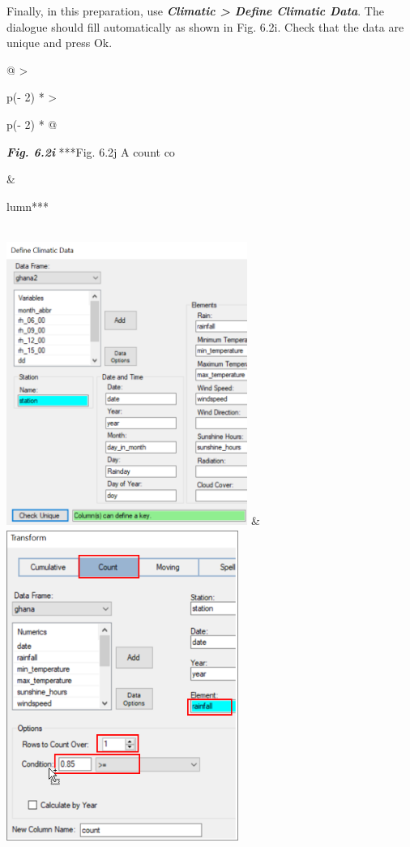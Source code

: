 \documentclass[
  letterpaper,
  DIV=11,
  numbers=noendperiod]{scrreprt}
\begin{document}
Finally, in this preparation, use \textbf{\emph{Climatic \textgreater{}
Define Climatic Data}}. The dialogue should fill automatically as shown
in Fig. 6.2i. Check that the data are unique and press Ok.

\begin{longtable}[]{@{}
  >{\raggedright\arraybackslash}p{(\columnwidth - 2\tabcolsep) * }
  >{\raggedright\arraybackslash}p{(\columnwidth - 2\tabcolsep) * }@{}}
\toprule\noalign{}
\begin{minipage}[b]{\linewidth}\raggedright
\textbf{\emph{Fig. 6.2i}} ***Fig. 6.2j A count co
\end{minipage} & \begin{minipage}[b]{\linewidth}\raggedright
lumn***
\end{minipage} \\
\midrule\noalign{}
\endhead
\bottomrule\noalign{}
\endlastfoot
\includegraphics[width=3.09696in,height=3.63753in]{figures/Fig6.2i.png}
&
\includegraphics[width=2.97829in,height=4.01954in]{figures/Fig6.2j.png} \\
\end{longtable}
\end{document}
